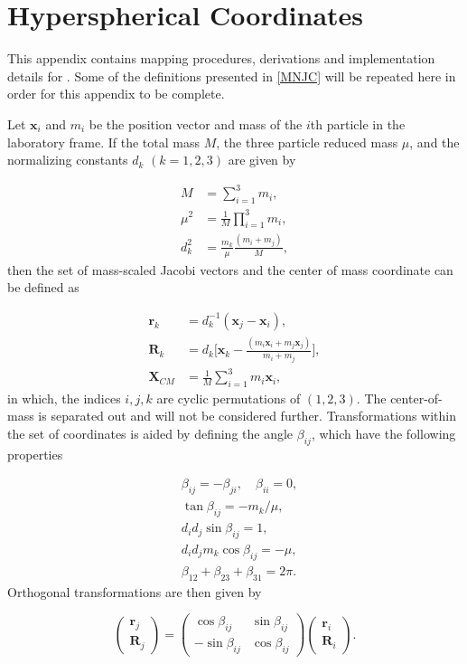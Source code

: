 \chapter{Hyperspherical Coordinates}
This appendix contains mapping procedures, derivations and implementation details for . Some of the definitions presented in \cref{MNJC} will be repeated here in order for this appendix to be complete.

Let $\mathbf{x}_i$ and $m_{i}$ be the position vector and mass of the $i$th particle in the laboratory frame. If the total mass $M$, the three particle reduced mass $\mu$, and the normalizing constants $d_{k}$ $(k=1,2,3)$ are given by

\begin{align}
M &= \sum_{i=1}^{3}m_i, \\
\mu^2 &= \frac{1}{M}\prod_{i=1}^{3}m_i,\\
d_k^2 &= \frac{m_k}{\mu}\frac{(m_i+m_j)}{M},
\end{align}
then the set of mass-scaled Jacobi vectors and the center of mass coordinate can be defined as

\begin{align}
\mathbf{r}_k &= d^{-1}_k(\mathbf{x}_{j}-\mathbf{x}_{i}), \\
\mathbf{R}_k &= d_k\Big[\mathbf{x}_{k}-\frac{(m_{i}\mathbf{x}_{i}+m_{j}\mathbf{x}_{j})}{m_{i}+m_{j}}\Big],\\
\mathbf{X}_{CM} &= \frac{1}{M} \sum_{i=1}^{3} m_{i} \mathbf{x}_{i},
\end{align}   
in which, the indices $i,j,k$ are cyclic permutations of $(1,2,3)$. The center-of-mass is separated out and will not be considered further. Transformations within the set of coordinates is aided by defining the angle $\beta_{ij}$, which have the following properties

\begin{subequations}
	\begin{align}
	&\beta_{ij} = -\beta_{ji}, \quad \beta_{ii} = 0,\\
	&\tan\beta_{ij} = -m_k/\mu,\\
	&d_{i}d_{j} \sin\beta_{ij} = 1,\\
	&d_{i}d_{j} m_{k} \cos\beta_{ij} = -\mu,\\
	&\beta_{12}+\beta_{23}+\beta_{31} = 2\pi.
	\end{align}
\end{subequations}
Orthogonal transformations are then given by 

\begin{equation}\label{eq:kinematic_rot}
\begin{pmatrix}
\mathbf{r}_j\\
\mathbf{R}_j
\end{pmatrix}
=
\begin{pmatrix}
\cos\beta_{ij} & \sin\beta_{ij}\\
-\sin\beta_{ij} & \cos\beta_{ij}
\end{pmatrix}
\begin{pmatrix}
\mathbf{r}_i\\
\mathbf{R}_i
\end{pmatrix}.
\end{equation}   

